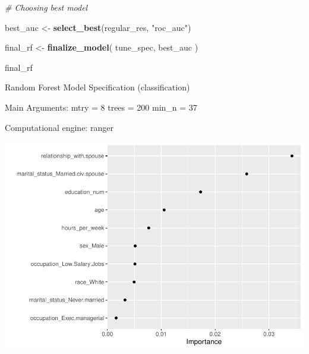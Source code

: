 \documentclass[]{article}
\newenvironment{Shaded}{\begin{snugshade}}{\end{snugshade}}
\newcommand{\CommentTok}[1]{\textcolor[rgb]{0.56,0.35,0.01}{\textit{#1}}}
\newcommand{\DataTypeTok}[1]{\textcolor[rgb]{0.13,0.29,0.53}{#1}}
\newcommand{\DecValTok}[1]{\textcolor[rgb]{0.00,0.00,0.81}{#1}}
\newcommand{\KeywordTok}[1]{\textcolor[rgb]{0.13,0.29,0.53}{\textbf{#1}}}
\newcommand{\NormalTok}[1]{#1}
\newcommand{\OperatorTok}[1]{\textcolor[rgb]{0.81,0.36,0.00}{\textbf{#1}}}
\newcommand{\StringTok}[1]{\textcolor[rgb]{0.31,0.60,0.02}{#1}}
\begin{document}
\begin{Shaded}
\begin{Highlighting}[]
\CommentTok{# Choosing best model}


\NormalTok{best_auc <-}\StringTok{ }\KeywordTok{select_best}\NormalTok{(regular_res, }\StringTok{"roc_auc"}\NormalTok{)}

\NormalTok{final_rf <-}\StringTok{ }\KeywordTok{finalize_model}\NormalTok{(}
\NormalTok{  tune_spec,}
\NormalTok{  best_auc}
\NormalTok{)}

\NormalTok{final_rf}
\end{Highlighting}
\end{Shaded}

Random Forest Model Specification (classification)

Main Arguments: mtry = 8 trees = 200 min\_n = 37

Computational engine: ranger

\begin{Shaded}
\end{Shaded}

\includegraphics{model_spec_files/figure-latex/unnamed-chunk-9-3.pdf}
\end{document}
